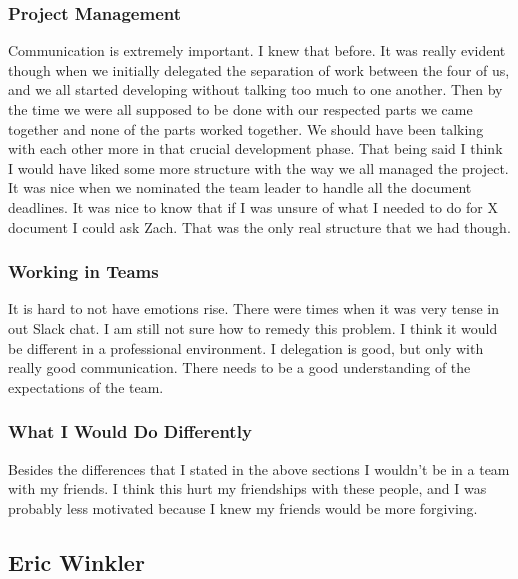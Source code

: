 \documentclass[letterpaper,10pt,titlepage,draftclsnofoot,onecolumn,onesided] {IEEEtran}
\begin{document}
\subsubsection{Project Management}

Communication is extremely important. 
I knew that before.
It was really evident though when we initially delegated the separation of work between the four of us, and we all started developing without talking too much to one another. 
Then by the time we were all supposed to be done with our respected parts we came together and none of the parts worked together. 
We should have been talking with each other more in that crucial development phase.
That being said
I think I would have liked some more structure with the way we all managed the project. 
It was nice when we nominated the team leader to handle all the document deadlines.
It was nice to know that if I was unsure of what I needed to do for X document I could ask Zach.
That was the only real structure that we had though. 	

\subsubsection{Working in Teams}

It is hard to not have emotions rise.
There were times when it was very tense in out Slack chat. 
I am still not sure how to remedy this problem.
I think it would be different in a professional environment.
I delegation is good, but only with really good communication.
There needs to be a good understanding of the expectations of the team.
 
\subsubsection{What I Would Do Differently}

Besides the differences that I stated in the above sections I wouldn't be in a team with my friends. 
I think this hurt my friendships with these people, and I was probably less motivated because I knew my friends would be more forgiving. 



\subsection{Eric Winkler}
\end{document}
